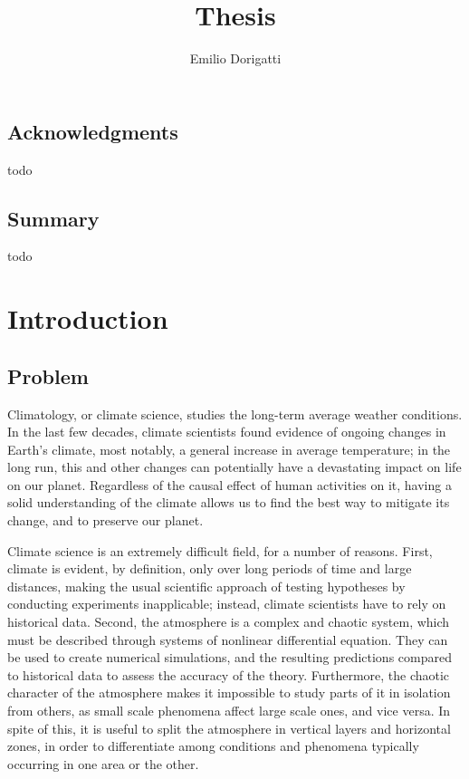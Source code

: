 \documentclass[12pt]{book}
\begin{document}
\title{Thesis}
\author{Emilio Dorigatti}

\maketitle


\section*{Acknowledgments}
todo

\newpage

\section*{Summary}
todo

\tableofcontents

\listoffigures

\listoftables

\chapter{Introduction}

\section{Problem}

Climatology, or climate science, studies the long-term average weather conditions. In the last few decades, climate scientists found evidence of ongoing changes in Earth's climate, most notably, a general increase in average temperature; in the long run, this and other changes can potentially have a devastating impact on life on our planet. Regardless of the causal effect of human activities on it, having a solid understanding of the climate allows us to find the best way to mitigate its change, and to preserve our planet.

Climate science is an extremely difficult field, for a number of reasons. First, climate is evident, by definition, only over long periods of time and large distances, making the usual scientific approach of testing hypotheses by conducting experiments inapplicable; instead, climate scientists have to rely on historical data. Second, the atmosphere is a complex and chaotic system, which must be described through systems of nonlinear differential equation. They can be used to create numerical simulations, and the resulting predictions compared to historical data to assess the accuracy of the theory. Furthermore, the chaotic character of the atmosphere makes it impossible to study parts of it in isolation from others, as small scale phenomena affect large scale ones, and vice versa. In spite of this, it is useful to split the atmosphere in vertical layers and horizontal zones, in order to differentiate among conditions and phenomena typically occurring in one area or the other.
\end{document}
